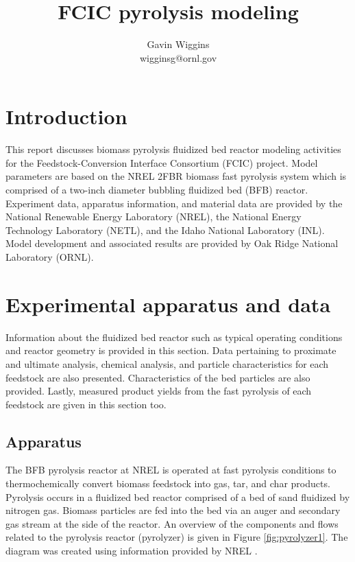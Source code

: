 \documentclass[12pt,titlepage]{article}
\title{FCIC pyrolysis modeling}
\author{Gavin Wiggins \\ wigginsg@ornl.gov}
\begin{document}
\hypersetup{pageanchor=false}
\maketitle
\tableofcontents
\newpage

\section{Introduction}

This report discusses biomass pyrolysis fluidized bed reactor modeling activities for the Feedstock-Conversion Interface Consortium (FCIC) project. Model parameters are based on the NREL 2FBR biomass fast pyrolysis system which is comprised of a two-inch diameter bubbling fluidized bed (BFB) reactor. Experiment data, apparatus information, and material data are provided by the National Renewable Energy Laboratory (NREL), the National Energy Technology Laboratory (NETL), and the Idaho National Laboratory (INL). Model development and associated results are provided by Oak Ridge National Laboratory (ORNL).

\section{Experimental apparatus and data}

Information about the fluidized bed reactor such as typical operating conditions and reactor geometry is provided in this section. Data pertaining to proximate and ultimate analysis, chemical analysis, and particle characteristics for each feedstock are also presented. Characteristics of the bed particles are also provided. Lastly, measured product yields from the fast pyrolysis of each feedstock are given in this section too.

\subsection{Apparatus}

The BFB pyrolysis reactor at NREL is operated at fast pyrolysis conditions to thermochemically convert biomass feedstock into gas, tar, and char products. Pyrolysis occurs in a fluidized bed reactor comprised of a bed of sand fluidized by nitrogen gas. Biomass particles are fed into the bed via an auger and secondary gas stream at the side of the reactor. An overview of the components and flows related to the pyrolysis reactor (pyrolyzer) is given in Figure \ref{fig:pyrolyzer1}. The diagram was created using information provided by NREL \cite{French-2019}.
\end{document}
